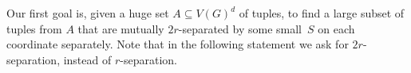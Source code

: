 	
Our first goal is, given a huge set $A\subseteq V(G)^d$ of tuples, to
find a large subset of tuples from $A$ that are mutually
$2r$-separated by some small~$S$ on each coordinate separately.  Note
that in the following statement we ask for $2r$-separation, instead of
$r$-separation.

